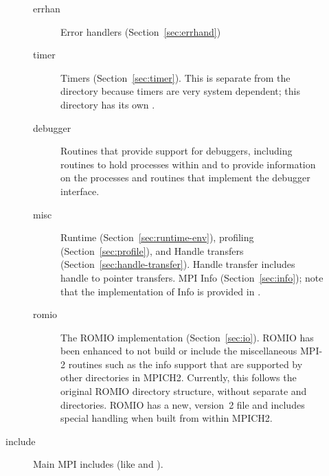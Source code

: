\documentclass{article}
\begin{document}
\begin{description}
\begin{description}
\begin{description}
    \item[errhan]Error handlers (Section~\ref{sec:errhand})
    \item[timer]Timers (Section~\ref{sec:timer}).  This is separate from the
       directory because timers are very system dependent; this
      directory has its own .
    \item[debugger]Routines that provide support for debuggers, including
      routines to hold processes within  and to 
      provide information on the processes and routines that implement the
      debugger interface.
    \item[misc]Runtime (Section~\ref{sec:runtime-env}), profiling
      (Section~\ref{sec:profile}), and Handle transfers
      (Section~\ref{sec:handle-transfer}).  Handle transfer includes handle to
      pointer transfers. MPI Info (Section~\ref{sec:info}); note that
      the implementation of Info is provided in .
    \item[romio]The ROMIO implementation (Section~\ref{sec:io}).  
      ROMIO has been enhanced to not build or include the miscellaneous MPI-2 
      routines such as the info support that are supported by other 
      directories in MPICH2.  Currently, this follows the original ROMIO
      directory structure, without separate  and 
      directories.    ROMIO has a new, version~2  file and
      includes special handling when built from within MPICH2.  
    \end{description}
\item[include]Main MPI includes (like  and ).  

\end{description}
\end{description}
\end{document}
